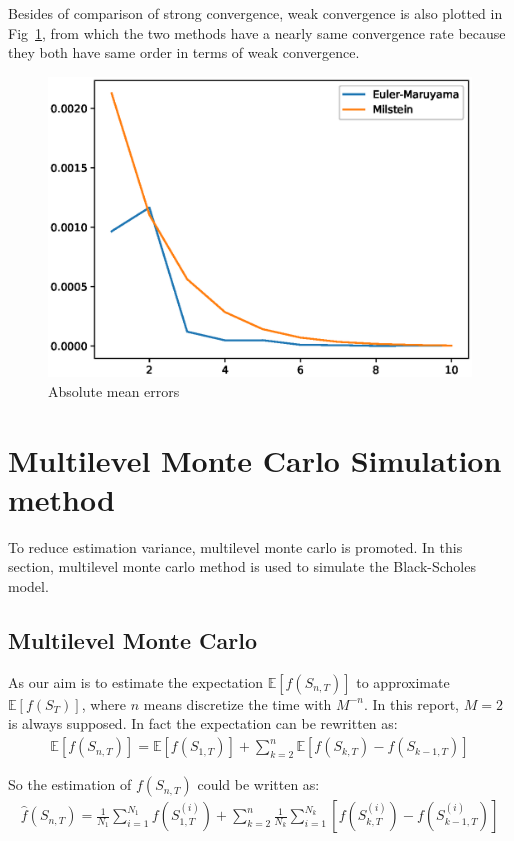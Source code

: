 \documentclass{article} %
\begin{document}
Besides of comparison of strong convergence, weak convergence is also plotted in Fig~\ref{fig:2}, from which the two methods have a nearly same convergence rate because they both have same order in terms of weak convergence.
\begin{figure}[htbp!]
  \centering
  \includegraphics[width=\textwidth]{mc-weak.eps}
  \caption{Absolute mean errors}
  \label{fig:2}
\end{figure}


\section{Multilevel Monte Carlo Simulation method}

To reduce estimation variance, multilevel monte carlo is promoted. In this section, multilevel monte carlo method is used to simulate the Black-Scholes model.
\subsection{Multilevel Monte Carlo}
As our aim is to estimate the expectation $\mathbb{E}[f(S_{n, T})]$ to approximate $\mathbb{E}[f(S_{T})]$, where $n$ means discretize the time with $M^{-n}$. In this report, $M=2$ is always supposed. In fact the expectation can be rewritten as:
\begin{align}
  \mathbb{E}[f(S_{n, T})]=\mathbb{E}[f(S_{1, T})] + \sum_{k=2}^{n}\mathbb{E}[f(S_{k, T})-f(S_{k-1, T})]
\end{align}

So the estimation of $f(S_{n, T})$ could be written as:
\begin{align}
  \widehat{f}(S_{n, T})=\frac{1}{N_{1}}\sum_{i=1}^{N_{1}}f(S_{1, T}^{(i)})+\sum_{k=2}^{n}\frac{1}{N_{k}}\sum_{i=1}^{N_{k}}[f(S_{k, T}^{(i)})-f(S_{k-1, T}^{(i)})]
\end{align}
\end{document}
